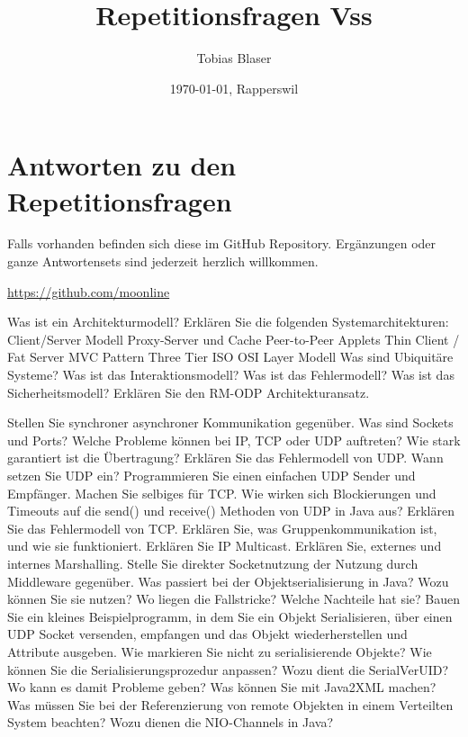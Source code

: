 \documentclass[ngerman,a4paper,12pt]{scrreprt}
\title{Repetitionsfragen Vss}
\author{Tobias Blaser}
\date{\today{}, Rapperswil}
\begin{document}
\tableofcontents

\vspace{1cm}
\section*{Antworten zu den Repetitionsfragen}
Falls vorhanden befinden sich diese im GitHub Repository. Ergänzungen oder ganze Antwortensets sind jederzeit herzlich willkommen.

\noindent\url{https://github.com/moonline}

\clearpage

\ol
	\li Was ist ein Architekturmodell?
	\li Erklären Sie die folgenden Systemarchitekturen:
		\ol
			\li Client/Server Modell
			\li Proxy-Server und Cache
			\li Peer-to-Peer
			\li Applets
			\li Thin Client / Fat Server
			\li MVC Pattern
			\li Three Tier
			\li ISO OSI Layer Modell
		\olE
	\li Was sind Ubiquitäre Systeme?
	\li Was ist das Interaktionsmodell?
	\li Was ist das Fehlermodell?
	\li Was ist das Sicherheitsmodell?
	\li Erklären Sie den RM-ODP Architekturansatz.
\olS


\olR
	\li Stellen Sie synchroner asynchroner Kommunikation gegenüber.
	\li Was sind Sockets und Ports?
	\li Welche Probleme können bei IP, TCP oder UDP auftreten? Wie stark garantiert ist die Übertragung?
	\li Erklären Sie das Fehlermodell von UDP.
	\li Wann setzen Sie UDP ein?
	\li Programmieren Sie einen einfachen UDP Sender und Empfänger. Machen Sie selbiges für TCP.
	\li Wie wirken sich Blockierungen und Timeouts auf die send() und receive() Methoden von UDP in Java aus?
	\li Erklären Sie das Fehlermodell von TCP.
	\li Erklären Sie, was Gruppenkommunikation ist, und wie sie funktioniert. Erklären Sie IP Multicast.
	\li Erklären Sie, externes und internes Marshalling.
	\li Stelle Sie direkter Socketnutzung der Nutzung durch Middleware gegenüber.
	\li Was passiert bei der Objektserialisierung in Java? Wozu können Sie sie nutzen? Wo liegen die Fallstricke? Welche Nachteile hat sie?
	\li Bauen Sie ein kleines Beispielprogramm, in dem Sie ein Objekt Serialisieren, über einen UDP Socket versenden, empfangen und das Objekt wiederherstellen und Attribute ausgeben.
	\li Wie markieren Sie nicht zu serialisierende Objekte? Wie können Sie die Serialisierungsprozedur anpassen?
	\li Wozu dient die SerialVerUID? Wo kann es damit Probleme geben?
	\li Was können Sie mit Java2XML machen?
	\li Was müssen Sie bei der Referenzierung von remote Objekten in einem Verteilten System beachten?
	\li Wozu dienen die NIO-Channels in Java?
\olS
\end{document}
